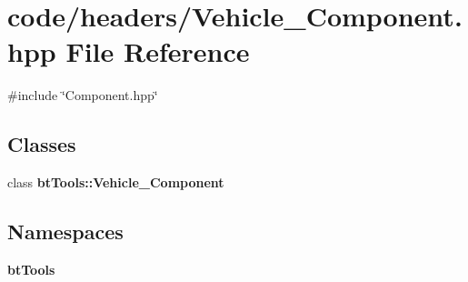 \section{code/headers/\+Vehicle\+\_\+\+Component.hpp File Reference}
\label{_vehicle___component_8hpp}
{\ttfamily \#include \char`\"{}Component.\+hpp\char`\"{}}\newline
\subsection*{Classes}
\begin{DoxyCompactItemize}
\item 
class \textbf{ bt\+Tools\+::\+Vehicle\+\_\+\+Component}
\end{DoxyCompactItemize}
\subsection*{Namespaces}
\begin{DoxyCompactItemize}
\item 
 \textbf{ bt\+Tools}
\end{DoxyCompactItemize}
